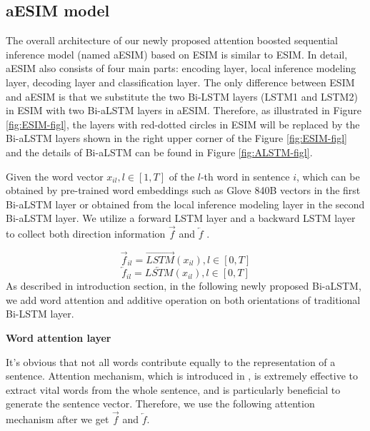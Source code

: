 \documentclass[10pt,sigconf]{acmart}
\begin{document}
\subsection{aESIM model}

The overall architecture of our newly proposed attention boosted sequential inference model (named aESIM) based on ESIM is similar to ESIM. In detail, aESIM also consists of four main parts: encoding layer, local inference modeling layer, decoding layer and classification layer. The only difference between ESIM and aESIM is that we substitute the two Bi-LSTM layers (LSTM1 and LSTM2) in ESIM with two Bi-aLSTM layers in aESIM. Therefore, as illustrated in Figure \ref{fig:ESIM-figl}, the layers with red-dotted circles in ESIM will be replaced by the Bi-aLSTM layers shown in the right upper corner of the Figure \ref{fig:ESIM-figl} and the details of Bi-aLSTM can be found in Figure \ref{fig:ALSTM-figl}.

Given the word vector ${{x}_{il}},l\in [1,T]$ of the $l$-th word in sentence $i$, which can be obtained by pre-trained word embeddings such as Glove 840B vectors \cite{pennington2014glove} in the first Bi-aLSTM layer or obtained from the local inference modeling layer in the second Bi-aLSTM layer. We utilize a forward LSTM layer and a backward LSTM layer to collect both direction information $\overrightarrow{f}$ and $\overleftarrow{f}$ .

\begin{equation}
{{\overrightarrow{f}}_{il}}=\overrightarrow{LSTM}({{x}_{il}}),l\in \left[ 0,T \right]
\end{equation}
\begin{equation}
{{\overleftarrow{f}}_{il}}=\overleftarrow{LSTM}({{x}_{il}}),l\in \left[ 0,T \right]
\end{equation}
As described in introduction section, in the following newly proposed Bi-aLSTM, we add word attention and additive operation on both orientations of traditional Bi-LSTM layer.

\textbf{Word attention layer}

It’s obvious that not all words contribute equally to the representation of a sentence. Attention mechanism, which is introduced in \cite{yang2016hierarchical}, is extremely effective to extract vital words from the whole sentence, and is particularly beneficial to generate the sentence vector. Therefore, we use the following attention mechanism after we get $\overrightarrow{f}$ and $\overleftarrow{f}$.
\end{document}

